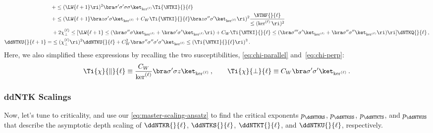 \begin{align}
&+\le(\LW{\ell+1}\ri)^2\bra \sigma^{\prime}\sigma^{\prime} \sigma\sigma\ket_{\ker^{(\ell)}}\Ti{\NTKI}{}{\ell}\, \notag\\
&+\le(\LW{\ell+1}\bra z \sigma^{\prime}\sigma\ket_{\ker^{(\ell)}}+C_W\Ti{\NTKI}{}{\ell}\bra z \sigma^{\prime\prime}\sigma^{\prime}\ket_{\ker^{(\ell)}}\ri)^2\frac{\NTHF{}{\ell}}{\le(\ker^{(\ell)}\ri)^2}\, \notag\\
&+2\chi_{\perp}^{(\ell)}\le[\LW{\ell+1}\le(\bra  \sigma^{\prime\prime}\sigma\ket_{\ker^{(\ell)}}+\bra  \sigma^{\prime}\sigma^{\prime}\ket_{\ker^{(\ell)}}\ri)+C_W\Ti{\NTKI}{}{\ell}\le(\bra  \sigma^{\prime\prime\prime}\sigma^{\prime}\ket_{\ker^{(\ell)}}+\bra  \sigma^{\prime\prime}\sigma^{\prime\prime}\ket_{\ker^{(\ell)}}\ri)\ri]\dNTKQ{}{\ell}\, ,\notag\\
\label{eq:U-recursions-single-input}\index{ddNTKs!statistics!U-recursion@$U$-recursion}
\ddNTKU{}{\ell+1}=&\le(\chi_{\perp}^{(\ell)}\ri)^2\ddNTKU{}{\ell}+C_W^2\bra \sigma^{\prime\prime} \sigma^{\prime\prime}\sigma^{\prime}\sigma^{\prime}\ket_{\ker^{(\ell)}}\le(\Ti{\NTKI}{}{\ell}\ri)^3\, .
\end{align}
Here, we also simplified these expressions by recalling the two susceptibilities, \eqref{eq:chi-parallel} and~\eqref{eq:chi-perp}: 
\begin{align}
\Ti{\chi}{\parallel}{\ell}  \equiv \frac{C_W}{\ker^{(\ell)}} \bra \sigma^\prime \sigma  z \ket_{\ker^{(\ell)}} \, , \qquad \Ti{\chi}{\perp}{\ell} 
\equiv  C_W\bra\sigma^{\prime}\sigma^{\prime}\ket_{\ker^{(\ell)}}\, .
\end{align}


\subsubsection{ddNTK Scalings}



Now, let's tune to criticality, and use our   \eqref{eq:master-scaling-ansatz} to find the critical exponents $p_\ddNTKRS$, $p_\ddNTKSS$, $p_\ddNTKTS$, and $p_\ddNTKUS$ that describe the asymptotic depth scaling of $\ddNTKR{}{\ell}$, $\ddNTKS{}{\ell}$, $\ddNTKT{}{\ell}$, and $\ddNTKU{}{\ell}$, respectively. 

